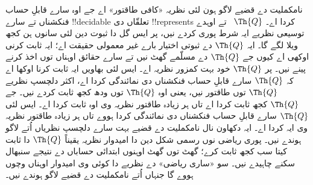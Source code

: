 \documentclass[../../../include/open-logic-section]{subfiles}
\begin{document}
نامکملیت دے
قضیے لاگو
ہون لئی
نظریہ «کافی
طاقتور» اے
جے اوہ
سارے قابلِ
حساب فنکشناں
تے سارے
!!{decidable}
تعلقّاں دی
!!{represents}
کردا اے۔
$\Th{Q}$~
تے اوہدے
توسیعی نظریے
ایہ شرط پوری
کردے نیں،
پر ایس
گل دا ثبوت
دین لئی
سانوں
ہن کجھ ویلا
لگے گا۔
ایہ
$\Th{Q}$
دے ثبوتی
اختیار بارے
غیر معمولی
حقیقت اے؛
ایہ ثابت
کرنی اوکھی
اے کیوں
جے
$\Th{Q}$
دے مسلّمے
گھٹ نیں
تے سارے
حقائق اوہناں
توں اخذ
کرنے پینے
نیں۔ پر
$\Th{Q}$
خود بہت
کمزور نظریہ
اے۔ ایس لئی
بھاویں ایہ
ثابت کرنا
اوکھا اے
کہ
$\Th{Q}$
سارے قابلِ
حساب فنکشناں
دی نمائندگی
کردا اے،
اکثر دلچسپ
نظریے
$\Th{Q}$
توں طاقتور
نیں، یعنی
اوہ
$\Th{Q}$
توں ودھ
کجھ ثابت
کردے نیں۔
جے
$\Th{Q}$
کجھ ثابت
کردا اے
تاں ہر
زیادہ طاقتور
نظریہ وی
اوہ ثابت
کردا اے۔
ایس لئی
$\Th{Q}$
سارے قابلِ
حساب فنکشناں
دی نمائندگی
کردا ہووے
تاں ہر
زیادہ طاقتور
نظریہ وی
ایہ کردا
اے۔ ایہ
دکھاون نال
نامکملیت
دے قضیے
بہت سارے
دلچسپ نظریاں
اُتے لاگو
ہوندے نیں۔
پوری ریاضی
نوں رسمی
شکل دین
دا امیدوار
نظریہ یقیناً
$\Th{Q}$
دا ثابت
کیتا سب کجھ
ثابت کرے؛
گھٹ توں
گھٹ اوہنوں
ابتدائی
حساباں دے
نتیجے سنبھال
سکنے چاہیدے
نیں۔ سو
«ساری ریاضی»
دے نظریے
دا کوئی وی
امیدوار اوہناں
وچوں ہووے
گا جنہاں
اُتے نامکملیت
دے قضیے
لاگو ہوندے
نیں۔
\end{document}
